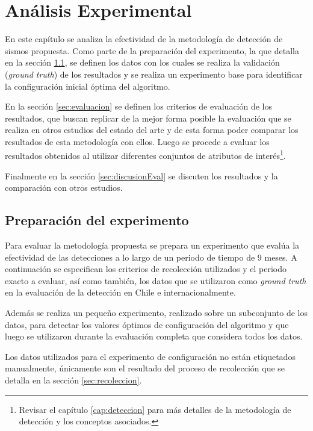 

\chapter{Análisis Experimental}
\label{cap:analisis}

En este capítulo se analiza la efectividad de la metodología de detección de sismos propuesta. 
%
Como parte de la preparación del experimento, la que detalla en la sección \ref{sec:preparacionExperimento}, se definen los datos con los cuales se realiza la validación (\textit{ground truth}) de los resultados y se realiza un experimento base para identificar la configuración inicial óptima del algoritmo.


En la sección \ref{sec:evaluacion} se definen los criterios de evaluación de los resultados, que buscan replicar de la mejor forma posible la evaluación que se realiza en otros estudios del estado del arte y de esta forma poder comparar los resultados de esta metodología con ellos.
%
Luego se procede a evaluar los resultados obtenidos al utilizar diferentes conjuntos de atributos de interés\footnote{Revisar el capítulo \ref{cap:deteccion} para más detalles de la metodología de detección y los conceptos asociados.}.

Finalmente en la sección \ref{sec:discusionEval} se discuten los resultados y la comparación con otros estudios. 

\section{Preparación del experimento}
\label{sec:preparacionExperimento}

Para evaluar la metodología propuesta se prepara un experimento que evalúa la efectividad de las detecciones a lo largo de un periodo de tiempo de 9 meses. A continuación se especifican los criterios de recolección utilizados y el periodo exacto a evaluar, así como también, los datos que se utilizaron como \textit{ground truth} en la evaluación de la detección en Chile e internacionalmente. 

Además se realiza un pequeño experimento, realizado sobre un subconjunto de los datos, para detectar los valores óptimos de configuración del algoritmo y que luego se utilizaron durante la evaluación completa que considera todos los datos.

Los datos utilizados para el experimento de configuración no están etiquetados manualmente, únicamente son el resultado del proceso de recolección que se detalla en la sección \ref{sec:recoleccion}.

